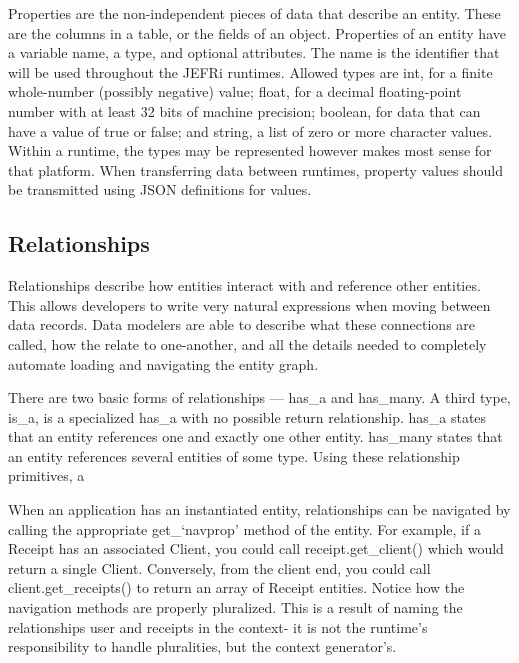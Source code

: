 \documentclass{article}
\begin{document}
Properties are the non-independent pieces of data that describe an entity. These
are the columns in a table, or the fields of an object. Properties of an entity
have a variable {\ilcode name}, a {\ilcode type}, and optional {\ilcode
attributes}. The name is the identifier that will be used throughout the JEFRi
runtimes. Allowed types are {\ilcode int}, for a finite whole-number (possibly
negative) value; {\ilcode float}, for a decimal floating-point number with at
least 32 bits of machine precision; {\ilcode boolean}, for data that can have a
value of {\ilcode true} or {\ilcode false}; and {\ilcode string}, a list of zero
or more character values. Within a runtime, the types may be represented however
makes most sense for that platform. When transferring data between runtimes,
property values should be transmitted using JSON definitions for values.

\subsection{Relationships}

Relationships describe how entities interact with and reference other entities.
This allows developers to write very natural expressions when moving between
data records. Data modelers are able to describe what these connections are
called, how the relate to one-another, and all the details needed to completely
automate loading and navigating the entity graph.

There are two basic forms of relationships --- {\ilcode has\_a} and {\ilcode
has\_many}. A third type, {\ilcode is\_a}, is a specialized {\ilcode has\_a}
with no possible return relationship. {\ilcode has\_a} states that an entity
references one and exactly one other entity. {\ilcode has\_many} states that an
entity references several entities of some type. Using these relationship
primitives, a

When an application has an instantiated entity, relationships can be navigated
by calling the appropriate {\ilcode get\_`navprop'} method of the entity. For
example, if a Receipt has an associated Client, you could call {\ilcode
receipt.get\_client()} which would return a single Client. Conversely, from the
client end, you could call {\ilcode client.get\_receipts()} to return an array
of Receipt entities. Notice how the navigation methods are properly pluralized.
This is a result of naming the relationships {\ilcode user} and {\ilcode
receipts} in the context- it is not the runtime's responsibility to handle
pluralities, but the context generator's.
\end{document}
